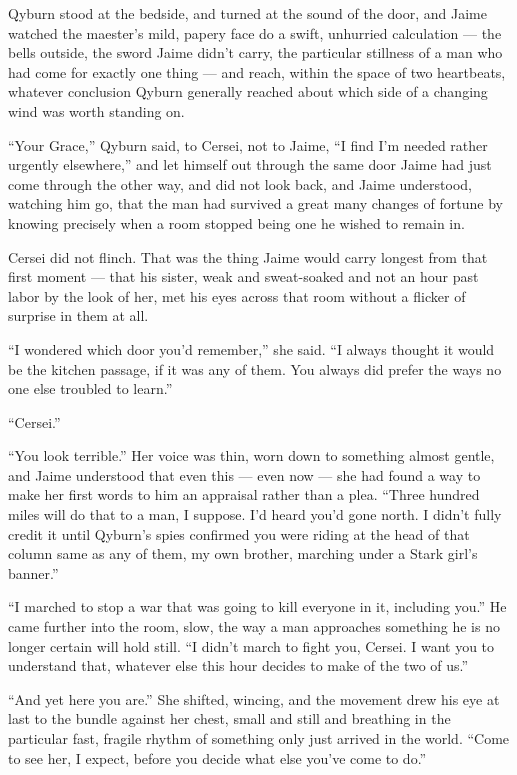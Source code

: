 Qyburn stood at the bedside, and turned at the sound of the door, and Jaime watched the maester’s mild, papery face do a swift, unhurried calculation — the bells outside, the sword Jaime didn’t carry, the particular stillness of a man who had come for exactly one thing — and reach, within the space of two heartbeats, whatever conclusion Qyburn generally reached about which side of a changing wind was worth standing on.

“Your Grace,” Qyburn said, to Cersei, not to Jaime, “I find I’m needed rather urgently elsewhere,” and let himself out through the same door Jaime had just come through the other way, and did not look back, and Jaime understood, watching him go, that the man had survived a great many changes of fortune by knowing precisely when a room stopped being one he wished to remain in.

Cersei did not flinch. That was the thing Jaime would carry longest from that first moment — that his sister, weak and sweat-soaked and not an hour past labor by the look of her, met his eyes across that room without a flicker of surprise in them at all.

“I wondered which door you’d remember,” she said. “I always thought it would be the kitchen passage, if it was any of them. You always did prefer the ways no one else troubled to learn.”

“Cersei.”

“You look terrible.” Her voice was thin, worn down to something almost gentle, and Jaime understood that even this — even now — she had found a way to make her first words to him an appraisal rather than a plea. “Three hundred miles will do that to a man, I suppose. I’d heard you’d gone north. I didn’t fully credit it until Qyburn’s spies confirmed you were riding at the head of that column same as any of them, my own brother, marching under a Stark girl’s banner.”

“I marched to stop a war that was going to kill everyone in it, including you.” He came further into the room, slow, the way a man approaches something he is no longer certain will hold still. “I didn’t march to fight you, Cersei. I want you to understand that, whatever else this hour decides to make of the two of us.”

“And yet here you are.” She shifted, wincing, and the movement drew his eye at last to the bundle against her chest, small and still and breathing in the particular fast, fragile rhythm of something only just arrived in the world. “Come to see her, I expect, before you decide what else you’ve come to do.”

